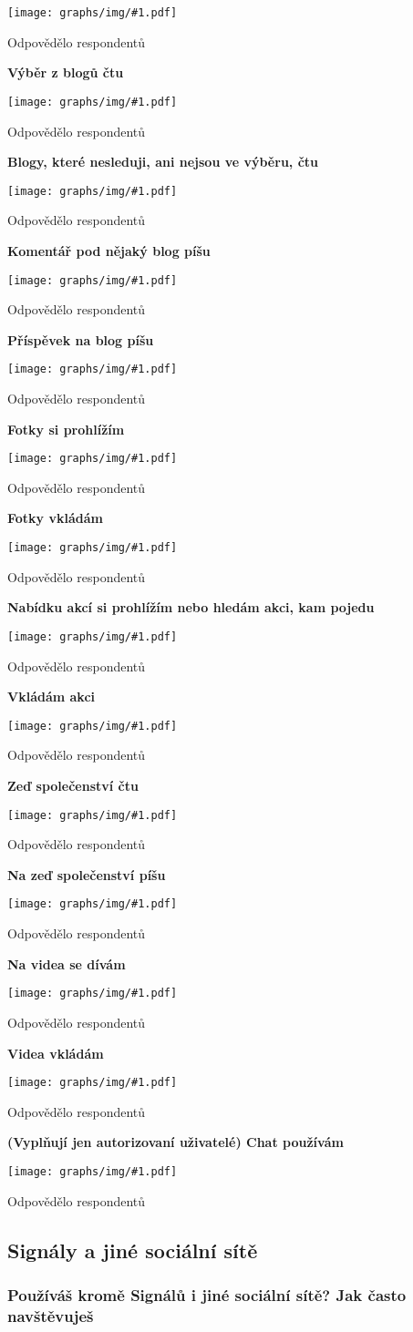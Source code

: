 \documentclass[12pt, a4paper, twoside]{article}
\newcommand{\answercount}[1]{Odpovědělo  respondentů}
\newcommand{\includegraph}[1]{
  \texttt{[image: graphs/img/\#1.pdf]}

  \answercount{#1}
}
\begin{document}
\includegraph{funkcionality_sledovane_blogy_ctu}

\textbf{Výběr z blogů čtu}

\includegraph{funkcionality_blogy_vyber_ctu}

\textbf{Blogy, které nesleduji, ani nejsou ve výběru, čtu}

\includegraph{funkcionality_blogy_nesledovane_ctu}

\textbf{Komentář pod nějaký blog píšu}

\includegraph{funkcionality_blog_komentuji}

\textbf{Příspěvek na blog píšu}

\includegraph{funkcionality_blog_pisu}

\textbf{Fotky si prohlížím}

\includegraph{funkcionality_fotky_prohlizim}

\textbf{Fotky vkládám}

\includegraph{funkcionality_fotky_vkladam}

\textbf{Nabídku akcí si prohlížím nebo hledám akci, kam pojedu}

\includegraph{funkcionality_akce_prohlizim}

\textbf{Vkládám akci}

\includegraph{funkcionality_akce_vkladam}

\textbf{Zeď společenství čtu}

\includegraph{funkcionality_zed_spolecenstvi_ctu}

\textbf{Na zeď společenství píšu}

\includegraph{funkcionality_zed_spolecenstvi_pisu}

\textbf{Na videa se dívám}

\includegraph{funkcionality_videa_prohlizim}

\textbf{Videa vkládám}

\includegraph{funkcionality_videa_vkladam}

\textbf{(Vyplňují jen autorizovaní uživatelé) Chat používám}

\includegraph{funkcionality_autorizovani_chat}

\subsection{Signály a jiné sociální sítě}\label{sec:jinesite}

\subsubsection{Používáš kromě Signálů i jiné sociální sítě? Jak často navštěvuješ}
\end{document}
